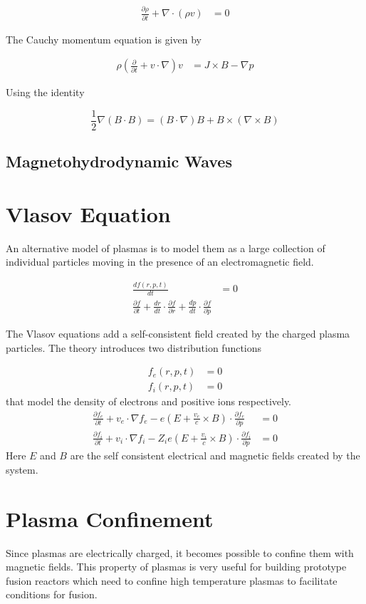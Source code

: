 \documentclass[book.tex]{subfiles}
\begin{document}
\begin{align}
    \frac{\partial \rho}{\partial t} + \nabla \cdot (\rho v) &= 0
\end{align}

The Cauchy momentum equation is given by

\begin{align} 
\rho \left ( \frac{\partial}{\partial t} + v \cdot \nabla  \right ) v &= J \times B - \nabla p 
\end{align} 

Using the identity 

\[ \frac{1}{2} \nabla (B \cdot B) = (B \cdot \nabla) B + B \times (\nabla \times B) \] 



\subsection{Magnetohydrodynamic Waves}


\section{Vlasov Equation}

An alternative model of plasmas is to model them as a large collection of individual particles moving in the presence of an electromagnetic field.  

\begin{align}
    \frac{d f(r, p, t)}{dt} &= 0 \\
    \frac{\partial f}{\partial t} + \frac{d r}{d t} \cdot \frac{\partial f}{\partial r} + \frac{d p}{d t}\cdot \frac{\partial f}{\partial p}
\end{align}

The Vlasov equations add a self-consistent field created by the charged plasma particles. The theory introduces two distribution functions

\begin{align}
    f_e(r, p, t) &= 0 \\
    f_i(r, p , t) &= 0
\end{align}
that model the density of electrons and positive ions respectively.
\begin{align}
    \frac{\partial f_e}{\partial t}+ v_e \cdot \nabla f_e - e \left (E + \frac{v_e}{c} \times B \right) \cdot \frac{\partial f_e}{\partial p} &= 0 \\
    \frac{\partial f_i}{\partial t}+ v_i \cdot \nabla f_i - Z_i e \left (E + \frac{v_i}{c} \times B \right) \cdot \frac{\partial f_i}{\partial p} &= 0
\end{align}
Here $E$ and $B$ are the self consistent electrical and magnetic fields created by the system.

\section{Plasma Confinement}

Since plasmas are electrically charged, it becomes possible to confine them with magnetic fields. This property of plasmas is very useful for building prototype fusion reactors which need to confine high temperature plasmas to facilitate conditions for fusion.
\end{document}
